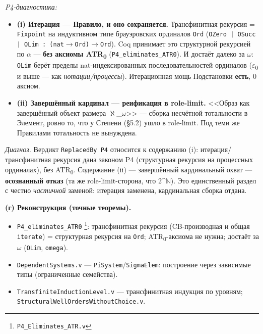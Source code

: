 \documentclass[11pt,a4paper]{article}
\begin{document}
\emph{P4-диагностика:}
\begin{itemize}
\item \textbf{(i) Итерация --- Правило, и оно сохраняется.} Трансфинитная рекурсия = \texttt{Fixpoint} на индуктивном типе брауэровских ординалов \texttt{Ord} (\texttt{OZero | OSucc | OLim : (nat$\to$Ord)$\to$Ord}). Coq принимает это структурной рекурсией по $\alpha$ --- \textbf{без аксиомы ATR\textsubscript{0}} (\texttt{P4\_\allowbreak{}eliminates\_\allowbreak{}ATR0}). И достаёт далеко за $\omega$: \texttt{OLim} берёт пределы nat-индексированных последовательностей ординалов ($\varepsilon$\textsubscript{0} и выше --- как \emph{нотации/процессы}). Итерационная мощь Подстановки \textbf{есть}, 0 аксиом.
\item \textbf{(ii) Завершённый кардинал --- реификация в role-limit.} <<Образ как завершённый объект размера $\aleph$\_$\omega$>> --- сборка несчётной тотальности в Элемент, ровно то, что у Степени (\S{}5.2) ушло в role-limit. Под теми же Правилами тотальность не вынуждена.
\end{itemize}

\emph{Диагноз.} Вердикт \texttt{Replaced\allowbreak{}By P4} относится к содержанию (i): итерация/трансфинитная рекурсия дана законом P4 (структурная рекурсия на процессных ординалах), без ATR\textsubscript{0}. Содержание (ii) --- завершённый кардинальный охват --- \textbf{осознанный отказ} (та же role-limit-сторона, что 2\textasciicircum{}$\mathbb{N}$). Это единственный раздел с честно \emph{частичной} заменой: итерация заменена, кардинальная сборка отдана.

\textbf{(г) Реконструкция (точные теоремы).}
\begin{itemize}
\item \texttt{P4\_\allowbreak{}eliminates\_\allowbreak{}ATR0} \footnote{\texttt{P4\_\allowbreak{}Eliminates\_\allowbreak{}ATR.v}}: трансфинитная рекурсия (CB-производная и общая \texttt{iterate}) = структурная рекурсия на \texttt{Ord}; ATR\textsubscript{0}-аксиома не нужна; достаёт за $\omega$ (\texttt{OLim}, \texttt{omega}).
\item \texttt{Dependent\allowbreak{}Systems.v} --- \texttt{Pi\allowbreak{}System}/\texttt{Sigma\allowbreak{}Elem}: построение через зависимые типы (ограниченные семейства).
\item \texttt{Transfinite\allowbreak{}Induction\allowbreak{}Level.v} --- трансфинитная индукция по уровням; \texttt{Structural\allowbreak{}Well\allowbreak{}Orders\allowbreak{}Without\allowbreak{}Choice.v}.
\end{itemize}
\end{document}
